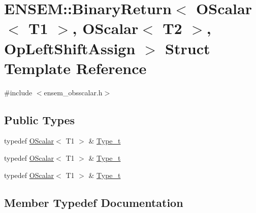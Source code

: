 \hypertarget{structENSEM_1_1BinaryReturn_3_01OScalar_3_01T1_01_4_00_01OScalar_3_01T2_01_4_00_01OpLeftShiftAssign_01_4}{}\section{E\+N\+S\+EM\+:\+:Binary\+Return$<$ O\+Scalar$<$ T1 $>$, O\+Scalar$<$ T2 $>$, Op\+Left\+Shift\+Assign $>$ Struct Template Reference}
\label{structENSEM_1_1BinaryReturn_3_01OScalar_3_01T1_01_4_00_01OScalar_3_01T2_01_4_00_01OpLeftShiftAssign_01_4}


{\ttfamily \#include $<$ensem\+\_\+obsscalar.\+h$>$}

\subsection*{Public Types}
\begin{DoxyCompactItemize}
\item 
typedef \mbox{\hyperlink{classENSEM_1_1OScalar}{O\+Scalar}}$<$ T1 $>$ \& \mbox{\hyperlink{structENSEM_1_1BinaryReturn_3_01OScalar_3_01T1_01_4_00_01OScalar_3_01T2_01_4_00_01OpLeftShiftAssign_01_4_aefc8eaf3b370f05aba6b11f335988425}{Type\+\_\+t}}
\item 
typedef \mbox{\hyperlink{classENSEM_1_1OScalar}{O\+Scalar}}$<$ T1 $>$ \& \mbox{\hyperlink{structENSEM_1_1BinaryReturn_3_01OScalar_3_01T1_01_4_00_01OScalar_3_01T2_01_4_00_01OpLeftShiftAssign_01_4_aefc8eaf3b370f05aba6b11f335988425}{Type\+\_\+t}}
\item 
typedef \mbox{\hyperlink{classENSEM_1_1OScalar}{O\+Scalar}}$<$ T1 $>$ \& \mbox{\hyperlink{structENSEM_1_1BinaryReturn_3_01OScalar_3_01T1_01_4_00_01OScalar_3_01T2_01_4_00_01OpLeftShiftAssign_01_4_aefc8eaf3b370f05aba6b11f335988425}{Type\+\_\+t}}
\end{DoxyCompactItemize}


\subsection{Member Typedef Documentation}
\mbox{\label{structENSEM_1_1BinaryReturn_3_01OScalar_3_01T1_01_4_00_01OScalar_3_01T2_01_4_00_01OpLeftShiftAssign_01_4_aefc8eaf3b370f05aba6b11f335988425}} 
